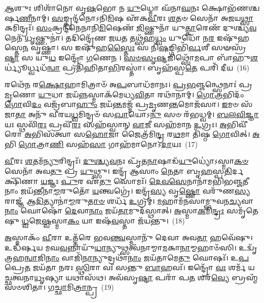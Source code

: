 {\anuvakamend[{\-\ul{𑌦𑍇}\-𑌵𑌾𑌃 \ul{𑌶}\-𑌤𑌪᳴𑌯𑌾 \ul{𑌅}\-𑌭𑌿 𑌵𑌾𑌜᳴\-\ul{𑌸𑍍𑌯} 𑌷𑌡𑍍𑌵𑌿𑍞᳴𑌶𑌤𑌿𑌶𑍍𑌚}]}%

\-\ul{𑌆}\-𑌶𑍁𑌃 𑌶𑌿𑌶𑌾᳴𑌨𑍋 𑌵𑍃\-\ul{𑌷}\-𑌭𑍋 𑌨 \ul{𑌯𑍁}\-𑌧𑍍𑌮𑍋 𑌘᳴𑌨𑌾\-\ul{𑌘}\-𑌨𑌃 𑌕𑍍𑌷𑍋𑌭᳴𑌣𑌶𑍍𑌚𑌰𑍍\mbox{}𑌷\-\ul{𑌣𑍀}\-𑌨𑌾𑌮𑍍। \ul{𑌸}\-𑌙𑍍𑌕𑍍𑌰𑌨𑍍𑌦᳴𑌨𑍋\-𑌽𑌨𑌿\-\ul{𑌮𑌿}\-𑌷 𑌏᳴𑌕\-\ul{𑌵𑍀}\-𑌰𑌃 \ul{𑌶}\-𑌤𑍞 𑌸𑍇𑌨𑌾᳴ 𑌅𑌜𑌯\-\ul{𑌥𑍍𑌸𑌾}\-𑌕𑌮𑌿𑌨𑍍𑌦𑍍𑌰𑌃᳴। \ul{𑌸𑌂}\-𑌕𑍍𑌰𑌨𑍍𑌦᳴𑌨𑍇𑌨𑌾𑌨𑌿\-\ul{𑌮𑌿}\-𑌷𑍇𑌣᳴ \ul{𑌜𑌿}\-𑌷𑍍𑌣𑍁𑌨𑌾᳴ 𑌯𑍁\-\ul{𑌤𑍍𑌕𑌾}\-𑌰𑍇𑌣᳴ 𑌦𑍁𑌶𑍍𑌚𑍍𑌯\-\ul{𑌵}\-𑌨𑍇𑌨᳴ \ul{𑌧𑍃}\-𑌷𑍍𑌣𑍁𑌨𑌾॑। 𑌤𑌦𑌿𑌨𑍍𑌦𑍍𑌰𑍇᳴𑌣 𑌜𑌯\-\ul{𑌤} 𑌤𑌥𑍍𑌸᳴𑌹\-\ul{𑌧𑍍𑌵𑌂} 𑌯𑍁𑌧𑍋᳴ 𑌨\-\ul{𑌰} 𑌇𑌷𑍁᳴𑌹𑌸𑍍𑌤𑍇\-\ul{𑌨} 𑌵𑍃𑌷𑍍𑌣𑌾॑। 𑌸 𑌇𑌷𑍁᳴𑌹\-\ul{𑌸𑍍𑌤𑍈𑌃} 𑌸 𑌨𑌿᳴\-\ul{𑌷}\-𑌙𑍍𑌗𑌿𑌭𑌿᳴\-\ul{𑌰𑍍𑌵}\-𑌶𑍀 𑌸𑍟𑌸𑍍𑌰᳴\-\ul{𑌷𑍍𑌟𑌾} 𑌸 𑌯𑍁\-\ul{𑌧} 𑌇𑌨𑍍𑌦𑍍𑌰𑍋᳴ \ul{𑌗}\-𑌣𑍇𑌨। \ul{𑌸}\-\-\ul{𑍞}\-\-\ul{𑌸𑍃}\-\-\ul{𑌷𑍍𑌟}\-𑌜𑌿𑌥𑍍𑌸𑍋᳴\-\ul{𑌮}\-𑌪𑌾 𑌬𑌾᳴𑌹𑍁\-\ul{𑌶}\-𑌰𑍍𑌧𑍍𑌯𑍂॑𑌰𑍍𑌧𑍍𑌵𑌧᳴\-\ul{𑌨𑍍𑌵𑌾} 𑌪𑍍𑌰𑌤𑌿᳴𑌹𑌿𑌤𑌾\-\ul{𑌭𑌿}\-𑌰𑌸𑍍𑌤𑌾॑। 𑌬𑍃𑌹᳴𑌸𑍍𑌪\-\ul{𑌤𑍇} 𑌪𑌰𑌿᳴ 𑌦𑍀𑌯~(16)

𑌰𑌥𑍇᳴𑌨 𑌰\-\ul{𑌕𑍍𑌷𑍋}\-𑌹𑌾𑌮𑌿𑌤𑍍𑌰𑌾𑍞᳴ 𑌅\-\ul{𑌪}\-𑌬𑌾𑌧᳴𑌮𑌾𑌨𑌃। \ul{𑌪𑍍𑌰}\-\-\ul{𑌭}\-𑌞𑍍𑌜𑌨𑍍𑌥𑍍𑌸𑍇𑌨𑌾𑌃॑ 𑌪𑍍𑌰\-\ul{𑌮𑍃}\-𑌣𑍋 \ul{𑌯𑍁}\-𑌧𑌾 𑌜𑌯᳴\-\ul{𑌨𑍍𑌨}\-𑌸𑍍𑌮𑌾𑌕᳴𑌮𑍇𑌧𑍍𑌯\-\ul{𑌵𑌿}\-𑌤𑌾 𑌰𑌥𑌾᳴𑌨𑌾𑌮𑍍। \ul{𑌗𑍋}\-\-\ul{𑌤𑍍𑌰}\-𑌭𑌿𑌦𑌂᳴ \ul{𑌗𑍋}\-𑌵𑌿\-\ul{𑌦𑌂} 𑌵𑌜𑍍𑌰᳴𑌬𑌾\-\ul{𑌹𑍁𑌂} 𑌜𑌯᳴\-\ul{𑌨𑍍𑌤}\-𑌮𑌜𑍍𑌮᳴ 𑌪𑍍𑌰\-\ul{𑌮𑍃}\-𑌣\-\ul{𑌨𑍍𑌤}\-𑌮𑍋𑌜᳴𑌸𑌾। \ul{𑌇}\-𑌮𑍞 𑌸᳴𑌜𑌾\-\ul{𑌤𑌾} 𑌅𑌨𑍁᳴ 𑌵𑍀𑌰𑌯\-\ul{𑌧𑍍𑌵}\-𑌮𑌿𑌨𑍍𑌦𑍍𑌰𑍞᳴ 𑌸\-\ul{𑌖𑌾}\-𑌯𑍋\-𑌽\-\ul{𑌨𑍁} 𑌸𑍞 𑌰᳴𑌭𑌧𑍍𑌵𑌮𑍍। \ul{𑌬}\-\-\ul{𑌲}\-\-\ul{𑌵𑌿}\-\-\ul{𑌜𑍍𑌞𑌾}\-𑌯𑌃 𑌸𑍍𑌥𑌵𑌿᳴\-\ul{𑌰𑌃} 𑌪𑍍𑌰𑌵𑍀᳴\-\ul{𑌰𑌃} 𑌸𑌹᳴𑌸𑍍𑌵𑌾𑌨𑍍 \ul{𑌵𑌾}\-𑌜𑍀 𑌸𑌹᳴𑌮𑌾𑌨 \ul{𑌉}\-𑌗𑍍𑌰𑌃। \ul{𑌅}\-𑌭𑌿𑌵𑍀᳴𑌰𑍋 \ul{𑌅}\-𑌭𑌿𑌸᳴𑌤𑍍𑌵𑌾 𑌸\-\ul{𑌹𑍋}\-𑌜𑌾 𑌜𑍈𑌤𑍍𑌰᳴𑌮𑌿\-\ul{𑌨𑍍𑌦𑍍𑌰} 𑌰\-\ul{𑌥}\-𑌮𑌾 𑌤𑌿᳴𑌷𑍍𑌠 \ul{𑌗𑍋}\-𑌵𑌿𑌤𑍍। \ul{𑌅}\-𑌭𑌿 \ul{𑌗𑍋}\-𑌤𑍍𑌰𑌾\-\ul{𑌣𑌿} 𑌸𑌹᳴\-\ul{𑌸𑌾} 𑌗𑌾𑌹᳴𑌮𑌾𑌨𑍋\-𑌽\-\ul{𑌦𑌾}\-𑌯𑌃~(17)

\-\ul{𑌵𑍀}\-𑌰𑌃 \ul{𑌶}\-𑌤𑌮᳴\-\ul{𑌨𑍍𑌯𑍁}\-𑌰𑌿𑌨𑍍𑌦𑍍𑌰𑌃᳴। \ul{𑌦𑍁}\-\-\ul{𑌶𑍍𑌚𑍍𑌯}\-\-\ul{𑌵}\-𑌨𑌃 𑌪𑍃᳴𑌤\-\ul{𑌨𑌾}\-𑌷𑌾𑌡᳴\-\ul{𑌯𑍁}\-𑌧𑍍𑌯𑍋॑\-𑌽𑌸𑍍𑌮𑌾\-\ul{𑌕}\-\-\ul{𑍞} 𑌸𑍇𑌨𑌾᳴ 𑌅𑌵\-\ul{𑌤𑍁} 𑌪𑍍𑌰 \ul{𑌯𑍁}\-𑌥𑍍𑌸𑍁। 𑌇𑌨𑍍𑌦𑍍𑌰᳴ 𑌆𑌸𑌾𑌂 \ul{𑌨𑍇}\-𑌤𑌾 𑌬𑍃\-\ul{𑌹}\-𑌸𑍍𑌪\-\ul{𑌤𑌿}\-𑌰𑍍𑌦𑌕𑍍𑌷𑌿᳴𑌣𑌾 \ul{𑌯}\-𑌜𑍍𑌞𑌃 \ul{𑌪𑍁}\-𑌰 𑌏᳴\-\ul{𑌤𑍁} 𑌸𑍋𑌮𑌃᳴। \ul{𑌦𑍇}\-\-\ul{𑌵}\-\-\ul{𑌸𑍇}\-𑌨𑌾𑌨𑌾᳴𑌮𑌭𑌿𑌭𑌞𑍍𑌜\-\ul{𑌤𑍀}\-𑌨𑌾𑌂 𑌜𑌯᳴𑌨𑍍𑌤𑍀𑌨𑌾\-\ul{𑌮𑍍𑌮}\-𑌰𑍁𑌤𑍋᳴ \ul{𑌯}\-𑌨𑍍𑌤𑍍𑌵𑌗𑍍𑌰𑍇॑। 𑌇𑌨𑍍𑌦𑍍𑌰᳴\-\ul{𑌸𑍍𑌯} 𑌵𑍃\-\ul{𑌷𑍍𑌣𑍋} 𑌵𑌰𑍁᳴𑌣\-\ul{𑌸𑍍𑌯} 𑌰𑌾𑌜𑍍𑌞᳴ 𑌆\-\ul{𑌦𑌿}\-𑌤𑍍𑌯𑌾𑌨𑌾॑\-\ul{𑌮𑍍𑌮}\-𑌰𑍁\-\ul{𑌤𑌾}\-\-\ul{𑍞} 𑌶𑌰𑍍𑌧᳴ \ul{𑌉}\-𑌗𑍍𑌰𑌮𑍍। \ul{𑌮}\-𑌹𑌾𑌮᳴𑌨𑌸𑌾𑌮𑍍𑌭𑍁𑌵𑌨\-\ul{𑌚𑍍𑌯}\-𑌵𑌾\-\ul{𑌨𑌾𑌂} 𑌘𑍋𑌷𑍋᳴ \ul{𑌦𑍇}\-𑌵𑌾\-\ul{𑌨𑌾𑌂} 𑌜𑌯᳴\-\ul{𑌤𑌾}\-𑌮𑍁𑌦᳴𑌸𑍍𑌥𑌾𑌤𑍍। \ul{𑌅}\-𑌸𑍍𑌮𑌾\-\ul{𑌕}\-𑌮𑌿\-\ul{𑌨𑍍𑌦𑍍𑌰𑌃} 𑌸𑌮𑍃᳴𑌤𑍇𑌷𑍁 \ul{𑌧𑍍𑌵}\-𑌜𑍇\-\ul{𑌷𑍍𑌵}\-𑌸𑍍𑌮𑌾\-\ul{𑌕𑌂} 𑌯𑌾 𑌇𑌷᳴\-\ul{𑌵}\-𑌸𑍍𑌤𑌾 𑌜᳴𑌯𑌨𑍍𑌤𑍁।~(18)

\-\ul{𑌅}\-𑌸𑍍𑌮𑌾𑌕𑌂᳴ \ul{𑌵𑍀}\-𑌰𑌾 𑌉𑌤𑍍𑌤᳴𑌰𑍇 𑌭𑌵\-\ul{𑌨𑍍𑌤𑍍𑌵}\-𑌸𑍍𑌮𑌾𑌨𑍁᳴ 𑌦𑍇𑌵𑌾 𑌅𑌵\-\ul{𑌤𑌾} 𑌹𑌵𑍇᳴𑌷𑍁। 𑌉𑌦𑍍𑌧᳴𑌰𑍍\mbox{}𑌷𑌯 𑌮𑌘\-\ul{𑌵}\-𑌨𑍍𑌨𑌾𑌯𑍁᳴\-\ul{𑌧𑌾}\-𑌨𑍍𑌯𑍁𑌥𑍍𑌸𑌤𑍍𑌵᳴𑌨𑌾𑌮𑍍𑌮𑌾\-\ul{𑌮}\-𑌕𑌾\-\ul{𑌨𑌾}\-𑌮𑍍𑌮𑌹𑌾𑍞᳴𑌸𑌿। 𑌉𑌦𑍍𑌵𑍃᳴𑌤𑍍𑌰𑌹\-\ul{𑌨𑍍𑌵𑌾}\-𑌜𑌿\-\ul{𑌨𑌾𑌂} 𑌵𑌾𑌜𑌿᳴\-\ul{𑌨𑌾}\-𑌨𑍍𑌯𑍁𑌦𑍍𑌰𑌥𑌾᳴\-\ul{𑌨𑌾𑌂} 𑌜𑌯᳴𑌤𑌾𑌮𑍇\-\ul{𑌤𑍁} 𑌘𑍋𑌷𑌃᳴। 𑌉\-\ul{𑌪} 𑌪𑍍𑌰𑍇\-\ul{𑌤} 𑌜𑌯᳴𑌤𑌾 𑌨𑌰𑌃 \ul{𑌸𑍍𑌥𑌿}\-𑌰𑌾 𑌵𑌃᳴ 𑌸𑌨𑍍𑌤𑍁 \ul{𑌬𑌾}\-𑌹𑌵𑌃᳴। 𑌇𑌨𑍍𑌦𑍍𑌰𑍋᳴ \ul{𑌵𑌃} 𑌶𑌰𑍍𑌮᳴ 𑌯𑌚𑍍𑌛𑌤𑍍𑌵𑌨𑌾\-\ul{𑌧𑍃}\-𑌷𑍍𑌯𑌾 𑌯𑌥𑌾𑌸᳴𑌥। 𑌅𑌵᳴𑌸𑍃\-\ul{𑌷𑍍𑌟𑌾} 𑌪𑌰𑌾᳴ 𑌪\-\ul{𑌤} 𑌶𑌰᳴\-\ul{𑌵𑍍𑌯𑍇} 𑌬𑍍𑌰𑌹𑍍𑌮᳴𑌸𑍞𑌶𑌿𑌤𑌾। 𑌗\-\ul{𑌚𑍍𑌛𑌾}\-𑌮𑌿\-\ul{𑌤𑍍𑌰𑌾}\-𑌨𑍍𑌪𑍍𑌰~(19)


